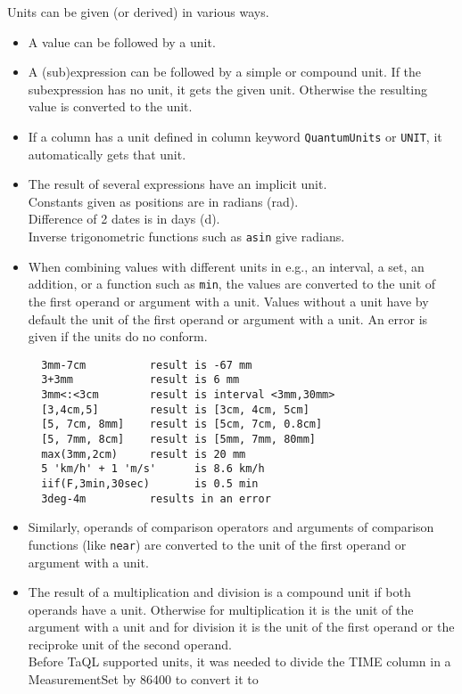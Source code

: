 Units can be given (or derived) in various ways.
\begin{itemize}
 \item A value can be followed by a unit.
 \item A (sub)expression can be followed by a simple or compound unit.
       If the subexpression has no unit, it gets the given unit.
       Otherwise the resulting value is converted to the unit.
 \item If a column has a unit defined in column keyword
	\texttt{QuantumUnits} or \texttt{UNIT}, it automatically
	gets that unit.
 \item The result of several expressions have an implicit unit.
	\\Constants given as positions are in radians (rad).
	\\Difference of 2 dates is in days (d).
	\\Inverse trigonometric functions such as \texttt{asin} give radians.
 \item When combining values with different units in e.g., an interval,
	a set, an addition, or a function such as \texttt{min}, the values
	are converted to the unit of the first operand or argument
	with a unit. Values without a unit have by default the unit
	of the first operand or argument with a unit. An error is
        given if the units do no conform.
\begin{verbatim}
  3mm-7cm          result is -67 mm
  3+3mm            result is 6 mm
  3mm<:<3cm        result is interval <3mm,30mm>
  [3,4cm,5]        result is [3cm, 4cm, 5cm]
  [5, 7cm, 8mm]    result is [5cm, 7cm, 0.8cm]
  [5, 7mm, 8cm]    result is [5mm, 7mm, 80mm]
  max(3mm,2cm)     result is 20 mm
  5 'km/h' + 1 'm/s'      is 8.6 km/h
  iif(F,3min,30sec)       is 0.5 min
  3deg-4m          results in an error
\end{verbatim}
 \item Similarly, operands of comparison operators and arguments of
	comparison functions (like \texttt{near}) are converted to
	the unit of the first operand or argument with a unit.
 \item The result of a multiplication and division is a compound unit
	if both operands have a unit. Otherwise for multiplication it is the unit of
	the argument with a unit and for division it is the unit of
        the first operand or the reciproke unit of the second operand.
        \\Before TaQL supported units, it was needed to divide the
	TIME column in a MeasurementSet by 86400 to convert it to

\end{itemize}
